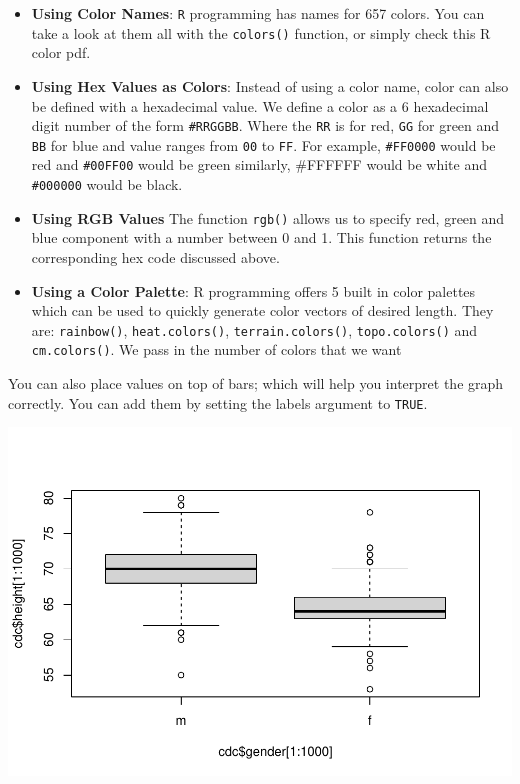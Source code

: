 \documentclass[
]{book}
\newenvironment{Shaded}{\begin{snugshade}}{\end{snugshade}}
\newcommand{\DataTypeTok}[1]{\textcolor[rgb]{0.13,0.29,0.53}{#1}}
\newcommand{\DecValTok}[1]{\textcolor[rgb]{0.00,0.00,0.81}{#1}}
\newcommand{\KeywordTok}[1]{\textcolor[rgb]{0.13,0.29,0.53}{\textbf{#1}}}
\newcommand{\NormalTok}[1]{#1}
\newcommand{\OperatorTok}[1]{\textcolor[rgb]{0.81,0.36,0.00}{\textbf{#1}}}
\newcommand{\OtherTok}[1]{\textcolor[rgb]{0.56,0.35,0.01}{#1}}
\newcommand{\StringTok}[1]{\textcolor[rgb]{0.31,0.60,0.02}{#1}}
\begin{document}
\begin{itemize}
\item
  \textbf{Using Color Names}: \texttt{R} programming has names for 657 colors. You can take a look at them all with the \texttt{colors()} function, or simply check this R color pdf.
\item
  \textbf{Using Hex Values as Colors}: Instead of using a color name, color can also be defined with a hexadecimal value. We define a color as a 6 hexadecimal digit number of the form \texttt{\#RRGGBB}. Where the \texttt{RR} is for red, \texttt{GG} for green and \texttt{BB} for blue and value ranges from \texttt{00} to \texttt{FF}. For example, \texttt{\#FF0000} would be red and \texttt{\#00FF00} would be green similarly, \#FFFFFF would be white and \texttt{\#000000} would be black.
\item
  \textbf{Using RGB Values} The function \texttt{rgb()} allows us to specify red, green and blue component with a number between 0 and 1. This function returns the corresponding hex code discussed above.
\item
  \textbf{Using a Color Palette}: R programming offers 5 built in color palettes which can be used to quickly generate color vectors of desired length. They are: \texttt{rainbow()}, \texttt{heat.colors()}, \texttt{terrain.colors()}, \texttt{topo.colors()} and \texttt{cm.colors()}. We pass in the number of colors that we want
\end{itemize}

You can also place values on top of bars; which will help you interpret the graph correctly. You can add them by setting the labels argument to \texttt{TRUE}.

\begin{Shaded}
\end{Shaded}

\includegraphics{_main_files/figure-latex/unnamed-chunk-227-1.pdf}
\end{document}
